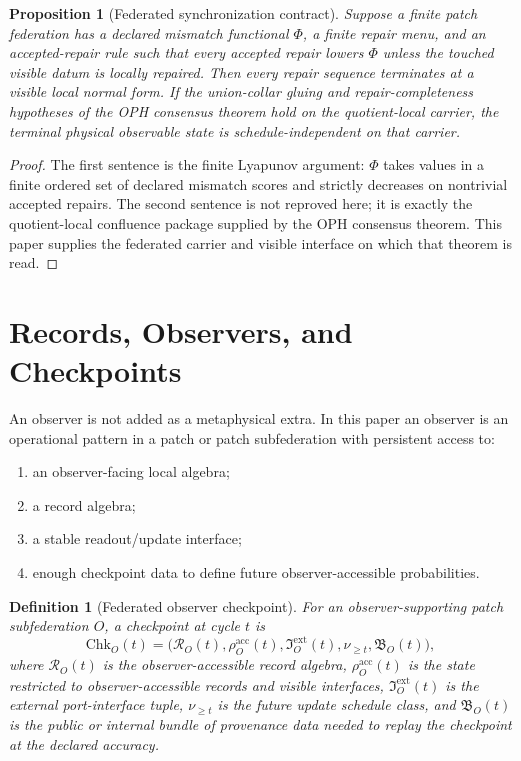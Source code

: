 \documentclass[11pt]{article}
\newtheorem{definition}[theorem]{Definition}
\newtheorem{proposition}[theorem]{Proposition}
\theoremstyle{remark}
\theoremstyle{plain}
\begin{document}
\begin{proposition}[Federated synchronization contract]
Suppose a finite patch federation has a declared mismatch functional \(\Phi\), a finite repair
menu, and an accepted-repair rule such that every accepted repair lowers \(\Phi\) unless the
touched visible datum is locally repaired. Then every repair sequence terminates at a visible
local normal form. If the union-collar gluing and repair-completeness hypotheses of the OPH
consensus theorem hold on the quotient-local carrier, the terminal physical observable state is
schedule-independent on that carrier.
\end{proposition}

\begin{proof}
The first sentence is the finite Lyapunov argument: \(\Phi\) takes values in a finite ordered set
of declared mismatch scores and strictly decreases on nontrivial accepted repairs. The second
sentence is not reproved here; it is exactly the quotient-local confluence package supplied by the
OPH consensus theorem. This paper supplies the federated carrier and visible interface on which
that theorem is read.
\end{proof}

\section{Records, Observers, and Checkpoints}

An observer is not added as a metaphysical extra. In this paper an observer is an operational
pattern in a patch or patch subfederation with persistent access to:
\begin{enumerate}[leftmargin=2em]
\item an observer-facing local algebra;
\item a record algebra;
\item a stable readout/update interface;
\item enough checkpoint data to define future observer-accessible probabilities.
\end{enumerate}

\begin{definition}[Federated observer checkpoint]
For an observer-supporting patch subfederation \(O\), a checkpoint at cycle \(t\) is
\[
\mathrm{Chk}_O(t)=
\bigl(
\mathcal R_O(t),
\rho_O^{\mathrm{acc}}(t),
\mathfrak I_O^{\mathrm{ext}}(t),
\nu_{\ge t},
\mathfrak B_O(t)
\bigr),
\]
where \(\mathcal R_O(t)\) is the observer-accessible record algebra,
\(\rho_O^{\mathrm{acc}}(t)\) is the state restricted to observer-accessible records and visible
interfaces, \(\mathfrak I_O^{\mathrm{ext}}(t)\) is the external port-interface tuple,
\(\nu_{\ge t}\) is the future update schedule class, and \(\mathfrak B_O(t)\) is the public or
internal bundle of provenance data needed to replay the checkpoint at the declared accuracy.
\end{definition}
\end{document}
